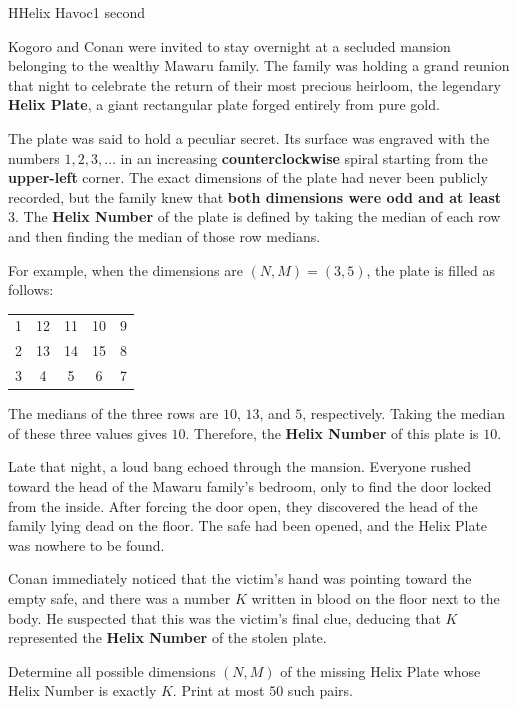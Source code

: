 \begin{problem}{H}{Helix Havoc}{1 second}

\noindent
Kogoro and Conan were invited to stay overnight at a secluded mansion belonging to the wealthy Mawaru family. The family was holding a grand reunion that night to celebrate the return of their most precious heirloom, the legendary \textbf{Helix Plate}, a giant rectangular plate forged entirely from pure gold.

\noindent
The plate was said to hold a peculiar secret. Its surface was engraved with the numbers $1,2,3,\ldots$ in an increasing \textbf{counterclockwise} spiral starting from the \textbf{upper-left} corner. The exact dimensions of the plate had never been publicly recorded, but the family knew that \textbf{both dimensions were odd and at least $3$}. The \textbf{Helix Number} of the plate is defined by taking the median of each row and then finding the median of those row medians.

\noindent
For example, when the dimensions are $(N,M)=(3,5)$, the plate is filled as follows:

\begin{tabular}{ccccc}
  1 & 12 & 11 & 10 & 9 \\
  2 & 13 & 14 &15 & 8 \\
  3 & 4 & 5 & 6 & 7  
\end{tabular}

\noindent
The medians of the three rows are $10$, $13$, and $5$, respectively. Taking the median of these three values gives $10$. Therefore, the \textbf{Helix Number} of this plate is $10$.

\noindent
Late that night, a loud bang echoed through the mansion. Everyone rushed toward the head of the Mawaru family's bedroom, only to find the door locked from the inside. After forcing the door open, they discovered the head of the family lying dead on the floor. The safe had been opened, and the Helix Plate was nowhere to be found.

\noindent
Conan immediately noticed that the victim's hand was pointing toward the empty safe, and there was a number $K$ written in blood on the floor next to the body. He suspected that this was the victim's final clue, deducing that $K$ represented the \textbf{Helix Number} of the stolen plate.

\noindent
Determine all possible dimensions $(N,M)$ of the missing Helix Plate whose Helix Number is exactly $K$. Print at most $50$ such pairs.

\InputFile


\end{problem}
